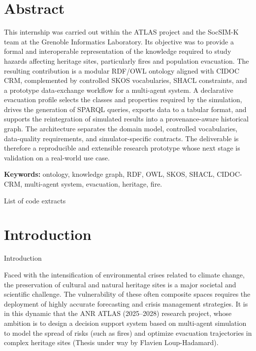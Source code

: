 \documentclass{article}
\begin{document}
\clearpage

\section*{Abstract}

This internship was carried out within the ATLAS project and the SocSIM-K team at the Grenoble Informatics Laboratory. Its objective was to provide a formal and interoperable representation of the knowledge required to study hazards affecting heritage sites, particularly fires and population evacuation. The resulting contribution is a modular RDF/OWL ontology aligned with CIDOC CRM, complemented by controlled SKOS vocabularies, SHACL constraints, and a prototype data-exchange workflow for a multi-agent system. A declarative evacuation profile selects the classes and properties required by the simulation, drives the generation of SPARQL queries, exports data to a tabular format, and supports the reintegration of simulated results into a provenance-aware historical graph. The architecture separates the domain model, controlled vocabularies, data-quality requirements, and simulator-specific contracts. The deliverable is therefore a reproducible and extensible research prototype whose next stage is validation on a real-world use case.

\textbf{Keywords:} ontology, knowledge graph, RDF, OWL, SKOS, SHACL, CIDOC-CRM, multi-agent system, evacuation, heritage, fire.

\clearpage

\renewcommand{\contentsname}{Table of Contents} %
\tableofcontents
\clearpage

\listoffigures
{}
\clearpage

\lstlistoflistings
{} {List of code extracts}
\clearpage

\section*{Introduction}
 {Introduction }

Faced with the intensification of environmental crises related to climate change, the preservation of cultural and natural heritage sites is a major societal and scientific challenge. The vulnerability of these often composite spaces requires the deployment of highly accurate forecasting and crisis management strategies. It is in this dynamic that the ANR ATLAS (2025--2028) research project, whose ambition is to design a decision support system based on multi-agent simulation to model the spread of risks (such as fires) and optimize evacuation trajectories in complex heritage sites (Thesis under way by Flavien Loup-Hadamard).
\end{document}
